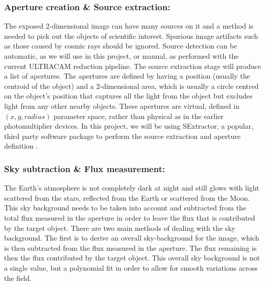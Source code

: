 \subsubsection{Aperture creation \& Source extraction:}
The exposed 2-dimensional image can have many sources on it and a method is needed to pick out the objects of scientific interest. Spurious image artifacts such as those caused by cosmic rays should be ignored. Source detection can be automatic, as we will use in this project, or manual, as performed with the current ULTRACAM reduction pipeline. The source extraction stage will produce a list of apertures. The apertures are defined by having a position (usually the centroid of the object) and a 2-dimensional area, which is usually a circle centred on the object's position that captures all the light from the object but excludes light from any other nearby objects. These apertures are virtual, defined in $(x, y, radius)$ parameter space, rather than physical as in the earlier photomultiplier devices. In this project, we will be using {SExtractor}, a popular, third party software package to perform the source extraction and aperture definition \citep{bertin}.

\subsubsection{Sky subtraction \& Flux measurement:}
The Earth's atmosphere is not completely dark at night and still glows with light scattered from the stars, reflected from the Earth or scattered from the Moon. This sky background needs to be taken into account and subtracted from the total flux measured in the aperture in order to leave the flux that is contributed by the target object. There are two main methods of dealing with the sky background. The first is to derive an overall sky-background for the image, which is then subtracted from the flux measured in the aperture. The flux remaining is then the flux contributed by the target object. This overall sky background is not a single value, but a polynomial fit in order to allow for smooth variations across the field. 

